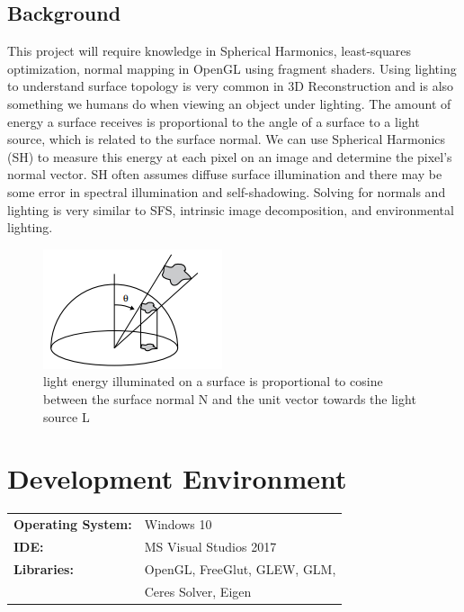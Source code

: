 \documentclass[10pt,twocolumn,letterpaper]{article}
\begin{document}
\subsection{Background}
This project will require knowledge in Spherical Harmonics, least-squares optimization, normal mapping in OpenGL using fragment shaders.
Using lighting to understand surface topology is very common in 3D Reconstruction and is also something we humans do when viewing an object under lighting. The amount of energy a surface receives is proportional to the angle of a surface to a light source, which is related to the surface normal. We can use Spherical Harmonics (SH) to measure this energy at each pixel on an image and determine the pixel's normal vector. SH often assumes diffuse surface illumination and there may be some error in spectral illumination and self-shadowing. Solving for normals and lighting is very similar to SFS, intrinsic image decomposition, and environmental lighting.

\begin{figure}[h]
	\begin{center}
		\includegraphics [scale=0.8] {image/energy.png}
	\end{center}
	\caption{light energy illuminated on a surface is proportional to cosine between the surface normal N and the unit vector towards the light source L}
	\label{fig:vgg-16}
\end{figure} 

\section{Development Environment}
\begin{table}[h]
	\begin{tabular}{ll}
		\textbf{Operating System:} &  Windows 10  \\
		\textbf{IDE:} &  MS Visual Studios 2017  \\
		\textbf{Libraries:} &  OpenGL, FreeGlut, GLEW, GLM,\\
		&Ceres Solver, Eigen
	\end{tabular}
\end{table}
\end{document}

